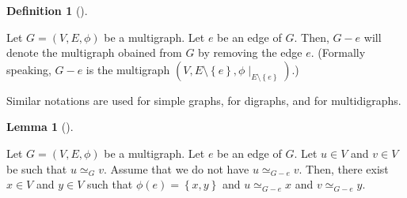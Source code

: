 \documentclass[numbers=enddot,12pt,final,onecolumn,notitlepage]{scrartcl}%
\theoremstyle{definition}
\newtheorem{lem}[theo]{Lemma}
\newenvironment{lemma}[1][]
{\begin{lem}[#1]\begin{leftbar}}
{\end{leftbar}\end{lem}}
\newtheorem{defi}[theo]{Definition}
\newenvironment{definition}[1][]
{\begin{defi}[#1]\begin{leftbar}}
{\end{leftbar}\end{defi}}
\newcommand{\set}[1]{\left\{ #1 \right\}}
\newcommand{\tup}[1]{\left( #1 \right)}
\begin{document}
\begin{definition} \label{def.hw3.conn.G-e}
Let $G = \tup{V, E, \phi}$ be a multigraph.
Let $e$ be an edge of $G$.
Then, $G - e$ will denote the multigraph obained from $G$ by
removing the edge $e$.
(Formally speaking, $G - e$ is the multigraph
$\tup{V, E \setminus \set{e}, \phi\mid_{E \setminus \set{e}}}$.)
\end{definition}

Similar notations are used for simple graphs, for digraphs,
and for multidigraphs.

\begin{lemma} \label{lem.hw3.conn.uG-ev}
Let $G = \tup{V, E, \phi}$ be a multigraph.
Let $e$ be an edge of $G$.
Let $u \in V$ and $v \in V$ be such that
$u \simeq_G v$.
Assume that we do not have $u \simeq_{G - e} v$.
Then, there exist $x \in V$ and $y \in V$ such that
$\phi\tup{e} = \set{x, y}$ and $u \simeq_{G - e} x$ and
$v \simeq_{G - e} y$.
\end{lemma}
\end{document}
